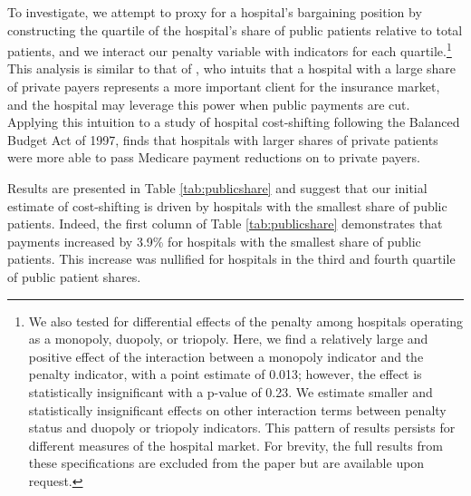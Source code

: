 \documentclass[12pt]{article}
\begin{document}
To investigate, we attempt to proxy for a hospital's bargaining position by constructing the quartile of the hospital's share of public patients relative to total patients, and we interact our penalty variable with indicators for each quartile.\footnote{We also tested for differential effects of the penalty among hospitals operating as a monopoly, duopoly, or triopoly. Here, we find a relatively large and positive effect of the interaction between a monopoly indicator and the penalty indicator, with a point estimate of 0.013; however, the effect is statistically insignificant with a p-value of 0.23. We estimate smaller and statistically insignificant effects on other interaction terms between penalty status and duopoly or triopoly indicators. This pattern of results persists for different measures of the hospital market. For brevity, the full results from these specifications are excluded from the paper but are available upon request.} This analysis is similar to that of \cite{wu2010}, who intuits that a hospital with a large share of private payers represents a more important client for the insurance market, and the hospital may leverage this power when public payments are cut. Applying this intuition to a study of hospital cost-shifting following the Balanced Budget Act of 1997, \cite{wu2010} finds that hospitals with larger shares of private patients were more able to pass Medicare payment reductions on to private payers.

Results are presented in Table \ref{tab:publicshare} and suggest that our initial estimate of cost-shifting is driven by hospitals with the smallest share of public patients. Indeed, the first column of Table \ref{tab:publicshare} demonstrates that payments increased by 3.9\% for hospitals with the smallest share of public patients. This increase was nullified for hospitals in the third and fourth quartile of public patient shares.
\end{document}
